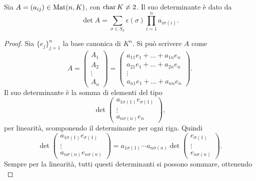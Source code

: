 \begin{teorema} \label{t:determinante-leibnitz}
	Sia $A=(a_{ij})\in\operatorname{Mat}(n,K)$, con $\operatorname{char} K\neq 2$.
	Il suo determinante è dato da
	\begin{equation}\label{eq:determinante-leibnitz}
		\det A=\sum_{\sigma\in S_n}\epsilon(\sigma)\prod_{i=1}^na_{i\sigma(i)}.
	\end{equation}
\end{teorema}
\begin{proof}
	Sia $\{e_j\}_{j=1}^n$ la base canonica di $K^n$.
	Si può scrivere $A$ come
	\begin{equation*}
		A=
		\begin{pmatrix}
			A_1\\A_2\\\vdots\\A_n
		\end{pmatrix}
		=
		\begin{pmatrix}
			a_{11}e_1+\dots+a_{1n}e_n\\
			a_{21}e_1+\dots+a_{2n}e_n\\
			\vdots\\
			a_{n1}e_1+\dots+a_{nn}e_n
		\end{pmatrix}.
	\end{equation*}
	Il suo determinante è la somma di elementi del tipo
	\begin{equation*}
		\det
		\begin{pmatrix}
			a_{1\sigma(1)}e_{\sigma(1)}\\
			\vdots\\
			a_{n\sigma(n)}e_n
		\end{pmatrix},
	\end{equation*}
	per linearità, scomponendo il determinante per ogni riga.
	Quindi
	\begin{equation*}
		\det
		\begin{pmatrix}
			a_{1\sigma(1)}e_{\sigma(1)}\\
			\vdots\\
			a_{n\sigma(n)}e_{n\sigma(n)}
		\end{pmatrix}
		=a_{1\sigma(1)}\cdots a_{n\sigma(n)}\det
		\begin{pmatrix}
			e_{\sigma(1)}\\
			\vdots\\e_{n\sigma(n)}
		\end{pmatrix}.
	\end{equation*}
	Sempre per la linearità, tutti questi determinanti si possono sommare, ottenendo
	\begin{equation*}

\end{equation*}
\end{proof}
